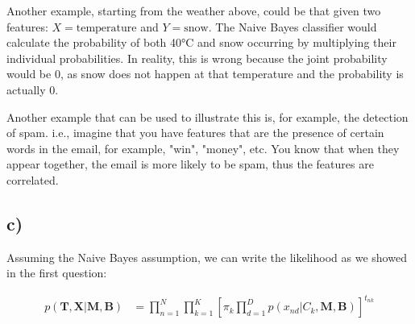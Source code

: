 \documentclass[12pt,a4paper,oneside]{paper}
\begin{document}
Another example, starting from the weather above, could be that given two features: $X = \text{temperature}$ and
$Y = \text{snow}$. The Naive Bayes classifier would calculate the probability of both 40°C and snow occurring
by multiplying their individual probabilities. In reality, this is wrong because the joint probability would be 0,
as snow does not happen at that temperature and the probability is actually 0.

Another example that can be used to illustrate this is, for example, the detection of spam. i.e., imagine that 
you have features that are the presence of certain words in the email, for example, "win", "money", etc. You know
that when they appear together, the email is more likely to be spam, thus the features are correlated.


\newpage
\subsection*{c)}

Assuming the Naive Bayes assumption, we can write the likelihood as we showed in the first question:

\begin{align*}
    p(\bm{T}, \bm{X} | \bm{M}, \bm{B}) &= \prod_{n=1}^{N} \prod_{k=1}^{K} [\pi_k \prod_{d=1}^{D} p(x_{nd} | C_k, \bm{M}, \bm{B})]^{t_{nk}}
\end{align*}
\end{document}
